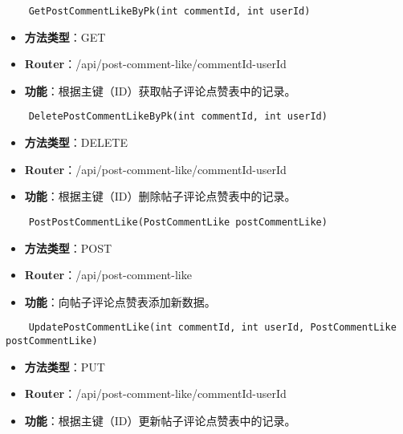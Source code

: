 \begin{verbatim}
	GetPostCommentLikeByPk(int commentId, int userId)
\end{verbatim}

\begin{itemize}
	\item \textbf{方法类型}：GET
	\item \textbf{Router}：/api/post-comment-like/{commentId}-{userId}
	\item \textbf{功能}：根据主键（ID）获取帖子评论点赞表中的记录。
\end{itemize}

\begin{verbatim}
	DeletePostCommentLikeByPk(int commentId, int userId)
\end{verbatim}

\begin{itemize}
	\item \textbf{方法类型}：DELETE
	\item \textbf{Router}：/api/post-comment-like/{commentId}-{userId}
	\item \textbf{功能}：根据主键（ID）删除帖子评论点赞表中的记录。
\end{itemize}

\begin{verbatim}
	PostPostCommentLike(PostCommentLike postCommentLike)
\end{verbatim}

\begin{itemize}
	\item \textbf{方法类型}：POST
	\item \textbf{Router}：/api/post-comment-like
	\item \textbf{功能}：向帖子评论点赞表添加新数据。
\end{itemize}

\begin{verbatim}
	UpdatePostCommentLike(int commentId, int userId, PostCommentLike postCommentLike)
\end{verbatim}

\begin{itemize}
	\item \textbf{方法类型}：PUT
	\item \textbf{Router}：/api/post-comment-like/{commentId}-{userId}
	\item \textbf{功能}：根据主键（ID）更新帖子评论点赞表中的记录。
\end{itemize}

